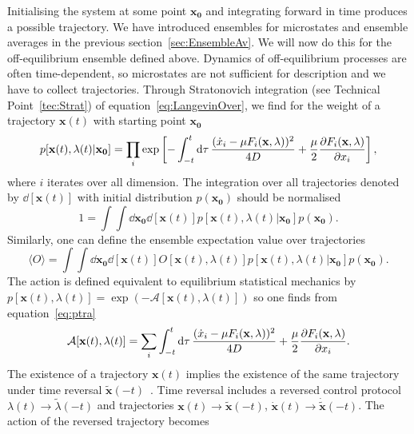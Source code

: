 Initialising the system at some point $\mathbf{x_0}$ and integrating forward in time produces a possible trajectory. We have introduced ensembles for microstates and ensemble averages in the previous section~\ref{sec:EnsembleAv}. We will now do this for the off-equilibrium ensemble defined above. Dynamics of off-equilibrium processes are often time-dependent, so microstates are not sufficient for description and we have to collect trajectories. Through Stratonovich integration (see Technical Point~\ref{tec:Strat}) of equation~\ref{eq:LangevinOver},  we find for the weight of a trajectory $\mathbf{x}(t)$ with starting point $\mathbf{x_0}$\cite{seifert2012stochastic}
\begin{equation}
 p [\mathbf{x}(t),\lambda(t) | \mathbf{x_0}] = \prod_i \exp \left [ - \int_{-t}^t \dd{\tau} \frac{ (\dot x_i - \mu F_i(\mathbf{x},\lambda))^2}{4D} + \frac{\mu}{2} \pdv{F_i(\mathbf{x},\lambda)}{x_i} \right ],
 \label{eq:ptra}
 \end{equation}
where $i$ iterates over all dimension. 
The integration over all trajectories denoted by $\dd{[\mathbf{x}( t)]}$ with initial distribution $p(\mathbf{x_0})$ should be normalised
 \begin{equation}
1= \int \int \dd{\mathbf{x_0}} \dd{[\mathbf{x}( t)]}  p [\mathbf{x}(t),\lambda(t) | \mathbf{x_0}] p(\mathbf{x_0}) .
 \end{equation}
Similarly, one can define the ensemble expectation value over trajectories
\begin{equation}
 \langle O \rangle = \int \int \dd{\mathbf{x_0}} \dd{[\mathbf{x}(t)]} O[\mathbf{x}(t),\lambda(t)]  p [\mathbf{x}(t),\lambda(t) | \mathbf{x_0}] p(\mathbf{x_0}) .
\end{equation}
The action is defined equivalent to equilibrium statistical mechanics by $p[ \mathbf{ x}(t),\lambda(t) ] = \exp (- \mathcal{A}[ \mathbf{ x}(t),\lambda(t) ])$ so one finds from equation~\ref{eq:ptra} 
\begin{equation}
 \mathcal{A} [ \mathbf{x}(t),\lambda(t) ]  = \sum_i \int_{-t}^t \dd{\tau} \frac{ (\dot x_i - \mu F_i(\mathbf{x},\lambda))^2}{4D} + \frac{\mu}{2} \pdv{F_i(\mathbf{x},\lambda)}{x_i} .
\end{equation}
The existence of a trajectory $\mathbf{x}(t)$ implies the existence of the same trajectory under time reversal $\mathbf{\tilde x} (-t)$~\cite{CrooksMicRev}. Time reversal includes a reversed control protocol 
$\lambda (t) \rightarrow \tilde \lambda(-t)$ and trajectories $\mathbf{x}(t) \rightarrow  \mathbf{\tilde x}(-t)$, $\mathbf{\dot x}(t) \rightarrow  \mathbf{ \dot {\tilde {x}}}(-t)$. The action of the reversed trajectory becomes
